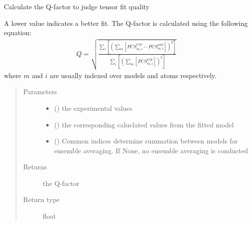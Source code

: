 \documentclass[a4paper,10pt,english]{sphinxmanual}
\begin{document}
\begin{fulllineitems}
\label{\detokenize{reference/generated/paramagpy.fit.qfactor:paramagpy.fit.qfactor}}
Calculate the Q-factor to judge tensor fit quality

A lower value indicates a better fit. The Q-factor is calculated using
the following equation:
\begin{equation*}
\begin{split}Q = \sqrt{
        \frac{\sum_i\left[\left(\sum_m\left[
        PCS^{exp}_{m,i}-PCS^{calc}_{m,i}\right]\right)^2\right]}
        {\sum_i\left[
        \left(\sum_m\left[PCS^{exp}_{m,i}\right]\right)^2\right]}
}\end{split}
\end{equation*}
where \(m\) and \(i\) are usually indexed over models and atoms
respectively.
\begin{quote}\begin{description}
\item[{Parameters}] \leavevmode\begin{itemize}
\item {} 
 () \textendash{} the experimental values

\item {} 
 () \textendash{} the corresponding caluclated values from the fitted model

\item {} 
 (\sphinxstyleliteralemphasis{\sphinxupquote{, }}) \textendash{} Common indices determine summation between models
for ensemble averaging.
If None, no ensemble averaging is conducted

\end{itemize}

\item[{Returns}] \leavevmode
{} \textendash{} the Q-factor

\item[{Return type}] \leavevmode
float

\end{description}\end{quote}

\end{fulllineitems}
\end{document}
